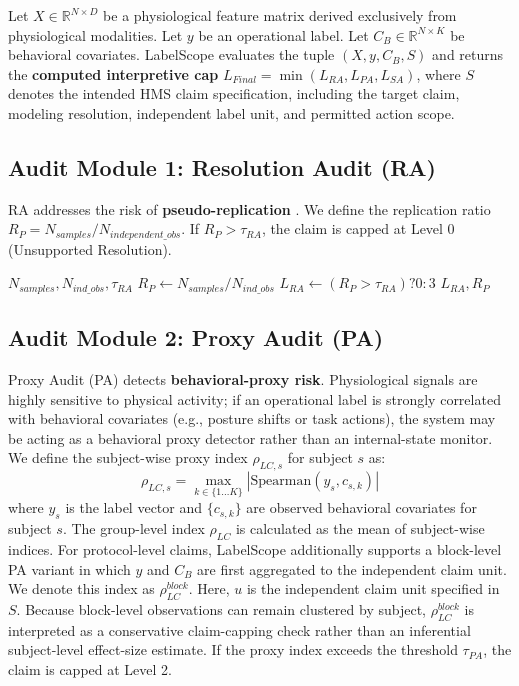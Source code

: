 \documentclass[journal]{IEEEtran}
\begin{document}
Let $X \in \mathbb{R}^{N \times D}$ be a physiological feature matrix derived exclusively from physiological modalities. Let $y$ be an operational label. Let $C_B \in \mathbb{R}^{N \times K}$ be behavioral covariates. LabelScope evaluates the tuple $(X, y, C_B, S)$ and returns the \textbf{computed interpretive cap} $L_{Final} = \min(L_{RA}, L_{PA}, L_{SA})$, where $S$ denotes the intended HMS claim specification, including the target claim, modeling resolution, independent label unit, and permitted action scope.

\subsection{Audit Module 1: Resolution Audit (RA)}
RA addresses the risk of \textbf{pseudo-replication} \cite{pseudo2015}. We define the replication ratio $R_P = N_{samples}/N_{independent\_obs}$. If $R_P > \tau_{RA}$, the claim is capped at Level 0 (Unsupported Resolution).

\begin{algorithm}
\caption{Resolution Audit (RA)}
\begin{algorithmic}[1]
\REQUIRE $N_{samples}, N_{ind\_obs}, \tau_{RA}$
\STATE $R_P \gets N_{samples} / N_{ind\_obs}$
\STATE $L_{RA} \gets (R_P > \tau_{RA}) ? 0 : 3$
\RETURN $L_{RA}, R_P$
\end{algorithmic}
\end{algorithm}

\subsection{Audit Module 2: Proxy Audit (PA)}
Proxy Audit (PA) detects \textbf{behavioral-proxy risk}. Physiological signals are highly sensitive to physical activity; if an operational label is strongly correlated with behavioral covariates (e.g., posture shifts or task actions), the system may be acting as a behavioral proxy detector rather than an internal-state monitor. We define the subject-wise proxy index $\rho_{LC,s}$ for subject $s$ as:
\begin{equation}
\rho_{LC,s} = \max_{k \in \{1 \dots K\}} |\mathrm{Spearman}(y_s, c_{s,k})|
\end{equation}
where $y_s$ is the label vector and $\{c_{s,k}\}$ are observed behavioral covariates for subject $s$. The group-level index $\rho_{LC}$ is calculated as the mean of subject-wise indices. For protocol-level claims, LabelScope additionally supports a block-level PA variant in which $y$ and $C_B$ are first aggregated to the independent claim unit. We denote this index as $\rho^{block}_{LC}$. Here, $u$ is the independent claim unit specified in $S$. Because block-level observations can remain clustered by subject, $\rho^{block}_{LC}$ is interpreted as a conservative claim-capping check rather than an inferential subject-level effect-size estimate. If the proxy index exceeds the threshold $\tau_{PA}$, the claim is capped at Level 2.
\end{document}
